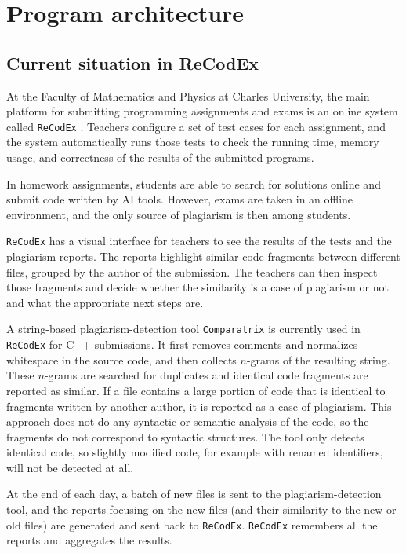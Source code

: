 \chapter{Program architecture}\label{sec:enterprise}

\section{Current situation in ReCodEx}

At the Faculty of Mathematics and Physics at Charles University, the main platform for submitting programming assignments and exams is an online system called \texttt{ReCodEx} \cite{recodex}.
Teachers configure a set of test cases for each assignment, and the system automatically runs those tests to check the running time, memory usage, and correctness of the results of the submitted programs.

In homework assignments, students are able to search for solutions online and submit code written by AI tools.
However, exams are taken in an offline environment, and the only source of plagiarism is then among students.

\texttt{ReCodEx} has a visual interface for teachers to see the results of the tests and the plagiarism reports.
The reports highlight similar code fragments between different files, grouped by the author of the submission.
The teachers can then inspect those fragments and decide whether the similarity is a case of plagiarism or not and what the appropriate next steps are.

A string-based plagiarism-detection tool \texttt{Comparatrix} \cite{comparatrix} is currently used in \texttt{ReCodEx} for C++ submissions.
It first removes comments and normalizes whitespace in the source code, and then collects $n$-grams of the resulting string.
These $n$-grams are searched for duplicates and identical code fragments are reported as similar.
If a file contains a large portion of code that is identical to fragments written by another author, it is reported as a case of plagiarism.
This approach does not do any syntactic or semantic analysis of the code, so the fragments do not correspond to syntactic structures.
The tool only detects identical code, so slightly modified code, for example with renamed identifiers, will not be detected at all.

At the end of each day, a batch of new files is sent to the plagiarism-detection tool, and the reports focusing on the new files (and their similarity to the new or old files) are generated and sent back to \texttt{ReCodEx}.
\texttt{ReCodEx} remembers all the reports and aggregates the results.

